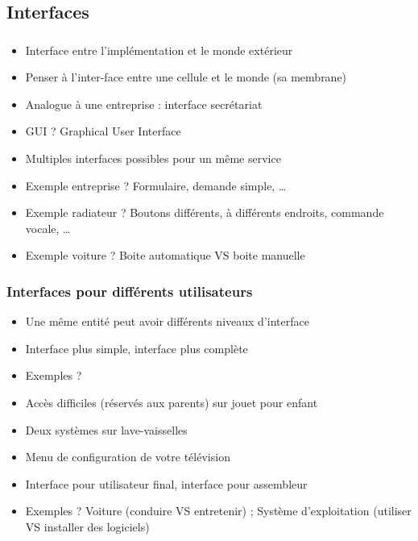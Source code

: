 \documentclass[english, french]{beamer}
\begin{document}
\subsection{Interfaces}
\begin{frame}
	\frametitle{\subsecname}
	\begin{itemize}
		\item Interface entre l’implémentation et le monde extérieur
		\item Penser à l’inter-face entre une cellule et le monde (sa membrane)
		\item Analogue à une entreprise : interface secrétariat
		\item GUI ? \pause Graphical User Interface
		\item Multiples interfaces possibles pour un même service
		\item Exemple entreprise ? \pause Formulaire, demande simple, …
		\item Exemple radiateur ? \pause Boutons différents, à différents endroits, commande vocale, …
		\item Exemple voiture ? \pause Boite automatique VS boite manuelle
	\end{itemize}
\end{frame}

\begin{frame}
	\frametitle{Interfaces pour différents utilisateurs}
	\begin{itemize}
		\item Une même entité peut avoir différents niveaux d’interface
		\item Interface plus simple, interface plus complète
		\item Exemples ? \pause 
		\item Accès difficiles (réservés aux parents) sur jouet pour enfant
		\item Deux systèmes sur lave-vaisselles
		\item Menu de configuration de votre télévision
		\item Interface pour utilisateur final, interface pour assembleur
		\item Exemples ? \pause Voiture (conduire VS entretenir) ; Système d’exploitation (utiliser VS installer des logiciels)
	\end{itemize}
\end{frame}
\end{document}
